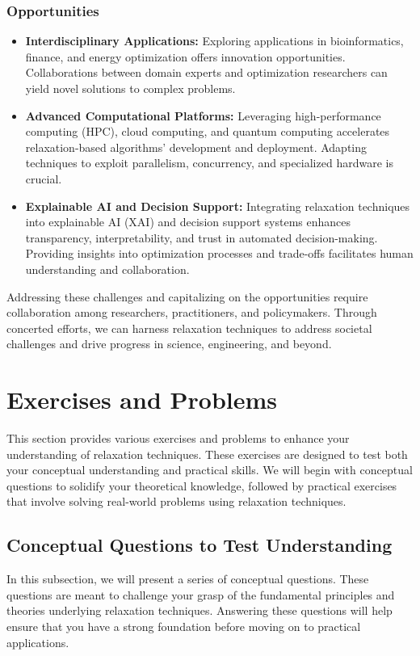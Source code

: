 \documentclass[12pt]{book} %
\begin{document}
\subsubsection{Opportunities}

\begin{itemize}
    \item \textbf{Interdisciplinary Applications:} Exploring applications in bioinformatics, finance, and energy optimization offers innovation opportunities. Collaborations between domain experts and optimization researchers can yield novel solutions to complex problems.
    \item \textbf{Advanced Computational Platforms:} Leveraging high-performance computing (HPC), cloud computing, and quantum computing accelerates relaxation-based algorithms' development and deployment. Adapting techniques to exploit parallelism, concurrency, and specialized hardware is crucial.
    \item \textbf{Explainable AI and Decision Support:} Integrating relaxation techniques into explainable AI (XAI) and decision support systems enhances transparency, interpretability, and trust in automated decision-making. Providing insights into optimization processes and trade-offs facilitates human understanding and collaboration.
\end{itemize}

Addressing these challenges and capitalizing on the opportunities require collaboration among researchers, practitioners, and policymakers. Through concerted efforts, we can harness relaxation techniques to address societal challenges and drive progress in science, engineering, and beyond.


\section{Exercises and Problems}
This section provides various exercises and problems to enhance your understanding of relaxation techniques. These exercises are designed to test both your conceptual understanding and practical skills. We will begin with conceptual questions to solidify your theoretical knowledge, followed by practical exercises that involve solving real-world problems using relaxation techniques.

\subsection{Conceptual Questions to Test Understanding}
In this subsection, we will present a series of conceptual questions. These questions are meant to challenge your grasp of the fundamental principles and theories underlying relaxation techniques. Answering these questions will help ensure that you have a strong foundation before moving on to practical applications.
\end{document}
